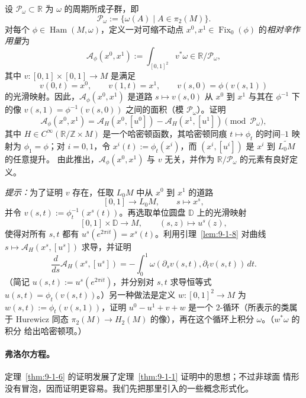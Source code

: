 \begin{exercise}\label{ex:9-1-11}
设 $\mathcal P_\omega\subset\mathbb R$ 为 $\omega$ 的周期所成子群，即
\[
  \mathcal P_\omega:=\{\omega(A)\mid A\in\pi_2(M)\}.
\]
对每个 $\phi\in\operatorname{Ham}(M,\omega)$，定义一对可缩不动点
$x^0,x^1\in\operatorname{Fix}_0(\phi)$ 的\emph{相对辛作用量}为
\[
  \mathcal A_\phi(x^0,x^1)
  :=\int_{[0,1]^2}v^*\omega\in\mathbb R/\mathcal P_\omega,
\]
其中 $v:[0,1]\times[0,1]\to M$ 是满足
\[
  v(0,t)=x^0,\qquad v(1,t)=x^1,\qquad v(s,0)=\phi(v(s,1))
\]
的光滑映射。因此，$\mathcal A_\phi(x^0,x^1)$ 是道路 $s\mapsto v(s,0)$ 从 $x^0$
到 $x^1$ 与其在 $\phi^{-1}$ 下的像
$v(s,1)=\phi^{-1}(v(s,0))$ 之间的面积（模 $\mathcal P_\omega$）。证明
\[
  \mathcal A_\phi(x^0,x^1)
  =\mathcal A_H(x^0,[u^0])-\mathcal A_H(x^1,[u^1])
  \pmod{\mathcal P_\omega},
\]
其中 $H\in C^\infty(\mathbb R/\mathbb Z\times M)$ 是一个哈密顿函数，其哈密顿同痕
$t\mapsto\phi_t$ 的时间--$1$ 映射为 $\phi_1=\phi$；对 $i=0,1$，令
$x^i(t):=\phi_t(x^i)$，而 $(x^i,[u^i])$ 是 $x^i$ 到 $\widetilde{L_0M}$ 的任意提升。
由此推出，$\mathcal A_\phi(x^0,x^1)$ 与 $v$ 无关，并作为
$\mathbb R/\mathcal P_\omega$ 的元素有良好定义。

\emph{提示：}为了证明 $v$ 存在，任取 $L_0M$ 中从 $x^0$ 到 $x^1$ 的道路
\[
  [0,1]\longrightarrow L_0M,\qquad s\longmapsto x^s,
\]
并令 $v(s,t):=\phi_t^{-1}(x^s(t))$。再选取单位圆盘
$\mathbb D$
上的光滑映射
\[
  [0,1]\times\mathbb D\longrightarrow M,
  \qquad (s,z)\longmapsto u^s(z),
\]
使得对所有 $s,t$ 都有 $u^s(e^{2\pi it})=x^s(t)$。利用引理~\ref{lem:9-1-8}
对曲线 $s\mapsto\mathcal A_H(x^s,[u^s])$ 求导，并证明
\[
  \frac d{ds}\mathcal A_H(x^s,[u^s])
  =-\int_0^1\omega(\partial_sv(s,t),\partial_tv(s,t))\,dt.
\]
（简记 $u(s,t):=u^s(e^{2\pi it})$，并分别对 $s,t$ 求导恒等式
$u(s,t)=\phi_t(v(s,t))$。）另一种做法是定义
$w:[0,1]^2\to M$ 为 $w(s,t):=\phi_t(v(s,1))$，证明
$u^0-u^1+v+w$ 是一个 $2$-循环（所表示的类属于 Hurewicz 同态
$\pi_2(M)\to H_2(M)$ 的像），再在这个循环上积分 $\omega$。（$w^*\omega$ 的积分
给出哈密顿项。）
\end{exercise}

\paragraph{弗洛尔方程。}
定理~\ref{thm:9-1-6} 的证明发展了定理~\ref{thm:9-1-1} 证明中的思想；不过非球面
情形没有冒泡，因而证明更容易。我们先把那里引入的一些概念形式化。

